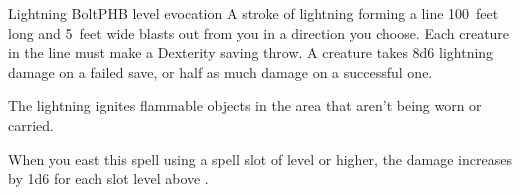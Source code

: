 \begin{spell}{Lightning Bolt}{PHB}{ level evocation}
{
}
A stroke of lightning forming a line 100~feet long and
5~feet wide blasts out from you in a direction you choose.
Each creature in the line must make a Dexterity saving
throw. A creature takes 8d6 lightning damage on a
failed save, or half as much damage on a successful one.

The lightning ignites flammable objects in the area
that aren't being worn or carried.

 When you east this spell using a
spell slot of  level or higher, the damage increases by
1d6 for each slot level above .
\end{spell}
